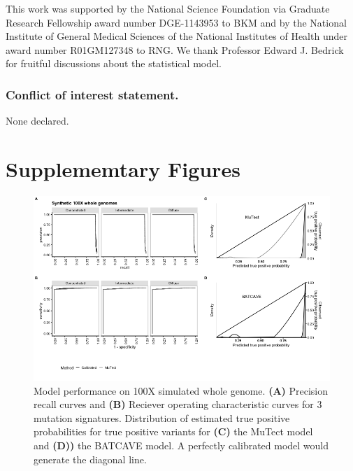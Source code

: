 \documentclass[a4,center,fleqn]{NAR}
\newcommand{\batcave}{BATCAVE }
\newcommand{\beginsupplement}{%
        \clearpage
        \onecolumn
        \setcounter{table}{0}
        \renewcommand{\thetable}{S\arabic{table}}%
        \setcounter{figure}{0}
        \renewcommand{\thefigure}{S\arabic{figure}}%
     }
\begin{document}
This work was supported by the National Science Foundation via Graduate Research Fellowship award number DGE-1143953 to BKM and by the National Institute of General Medical Sciences of the National Institutes of Health under award number R01GM127348 to RNG.
We thank Professor Edward J. Bedrick for fruitful discussions about the statistical model.

\subsubsection{Conflict of interest statement.} None declared.



\beginsupplement
\section{Supplememtary Figures}

\begin{figure}[b]
  \begin{center}
  \includegraphics[width=\textwidth]{figures/fig_wgs.png}
  \end{center}
  \caption{Model performance on 100X simulated whole genome.
  \textbf{(A)} Precision recall curves and \textbf{(B)} Reciever operating characteristic curves for 3 mutation signatures.
  Distribution of estimated true positive probabilities for true positive  variants for \textbf{(C)} the MuTect model and \textbf{(D))} the \batcave model.
  A perfectly calibrated model would generate the diagonal line.}
\label{NAR-wgs_fig}
\end{figure}
\end{document}
